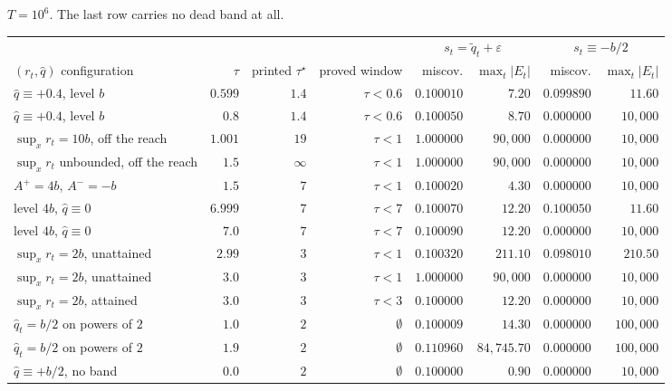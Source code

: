 \begin{table}[!ht]
{$T = 10^6$. The last row carries no dead band at all.}
\label{tab:stress}
\begin{tabular}{@{}lrrrrrrr@{}}
\toprule
 & & & & \multicolumn{2}{c}{$s_t = \tilde{q}_t+\varepsilon$} &
 \multicolumn{2}{c}{$s_t \equiv -b/2$} \\
\cmidrule(lr){5-6}\cmidrule(lr){7-8}
$(r_t,\hat{q})$ configuration & $\tau$ & printed $\tau^{\star}$ & proved window &
miscov. & $\max_t|E_t|$ & miscov. & $\max_t|E_t|$ \\
\midrule
$\hat{q} \equiv +0.4$, level $b$        & $0.599$ & $1.4$ & $\tau < 0.6$ & $0.100010$ & $7.20$ & $0.099890$ & $11.60$ \\
$\hat{q} \equiv +0.4$, level $b$        & $0.8$   & $1.4$ & $\tau < 0.6$ & $0.100050$ & $8.70$ & $\mathbf{0.000000}$ & $10{,}000$ \\
$\sup_x r_t = 10b$, off the reach       & $1.001$ & $19$  & $\tau < 1$   & $\mathbf{1.000000}$ & $90{,}000$ & $0.000000$ & $10{,}000$ \\
$\sup_x r_t$ unbounded, off the reach   & $1.5$   & $\infty$ & $\tau < 1$ & $\mathbf{1.000000}$ & $90{,}000$ & $0.000000$ & $10{,}000$ \\
$A^{+} = 4b$, $A^{-} = -b$              & $1.5$   & $7$   & $\tau < 1$   & $0.100020$ & $4.30$ & $\mathbf{0.000000}$ & $10{,}000$ \\
level $4b$, $\hat{q} \equiv 0$          & $6.999$ & $7$   & $\tau < 7$   & $0.100070$ & $12.20$ & $0.100050$ & $11.60$ \\
level $4b$, $\hat{q} \equiv 0$          & $7.0$   & $7$   & $\tau < 7$   & $0.100090$ & $12.20$ & $\mathbf{0.000000}$ & $10{,}000$ \\
$\sup_x r_t = 2b$, unattained           & $2.99$  & $3$   & $\tau < 1$   & $0.100320$ & $211.10$ & $0.098010$ & $210.50$ \\
$\sup_x r_t = 2b$, unattained           & $3.0$   & $3$   & $\tau < 1$   & $\mathbf{1.000000}$ & $90{,}000$ & $0.000000$ & $10{,}000$ \\
$\sup_x r_t = 2b$, attained             & $3.0$   & $3$   & $\tau < 3$   & $0.100000$ & $12.20$ & $\mathbf{0.000000}$ & $10{,}000$ \\
$\hat{q}_t = b/2$ on powers of $2$      & $1.0$   & $2$   & $\emptyset$    & $0.100009$ & $14.30$ & $\mathbf{0.000000}$ & $100{,}000$ \\
$\hat{q}_t = b/2$ on powers of $2$      & $1.9$   & $2$   & $\emptyset$    & $\mathbf{0.110960}$ & $84{,}745.70$ & $0.000000$ & $100{,}000$ \\
$\hat{q} \equiv +b/2$, no band          & $0.0$   & $2$   & $\emptyset$    & $0.100000$ & $0.90$ & $\mathbf{0.000000}$ & $10{,}000$ \\
\bottomrule
\end{tabular}
\end{table}

